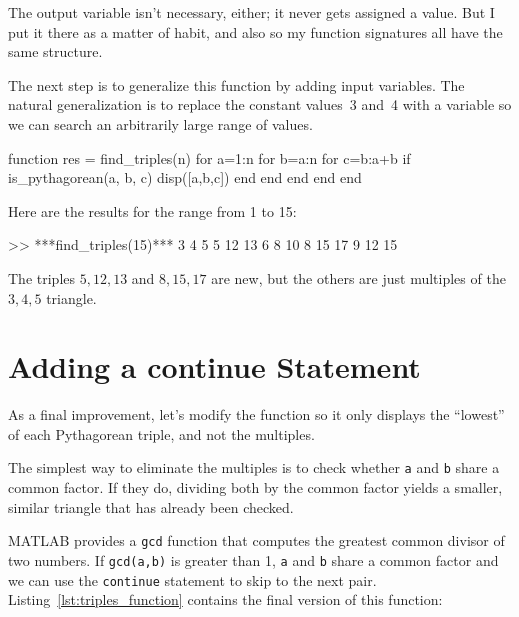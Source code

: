 The output variable isn't necessary, either; it
never gets assigned a value.  But I put it there as a matter of
habit, and also so my function signatures all have the same structure.


The next step is to generalize this function by adding input
variables.  The natural generalization is to replace the constant
values~3 and~4 with a variable so we can search an arbitrarily large
range of values.

\begin{code}
function res = find_triples(n)
    for a=1:n
        for b=a:n
            for c=b:a+b
                if is_pythagorean(a, b, c)
                    disp([a,b,c])
                end
            end
        end
    end
end
\end{code}

Here are the results for the range from 1 to 15:

\begin{code}
>> ***find_triples(15)***
     3     4     5
     5    12    13
     6     8    10
     8    15    17
     9    12    15
\end{code}

The triples $5,12,13$ and $8,15,17$ are new, but the others are just multiples of the $3,4,5$ triangle.

\section{Adding a continue Statement}


As a final improvement, let's modify the function so it only
displays the ``lowest'' of each Pythagorean triple, and not the
multiples.

The simplest way to eliminate the multiples is to check whether
\lstinline{a} and \lstinline{b} share a common factor.  If they do, dividing both
by the common factor yields a smaller, similar triangle that has
already been checked.


MATLAB provides a \lstinline{gcd} function that computes the greatest common
divisor of two numbers.  If \lstinline{gcd(a,b)} is greater than 1,
\lstinline{a} and \lstinline{b} share a common factor and we can use the \lstinline{continue}
statement to skip to the next pair. Listing~\ref{lst:triples_function} contains the final version of this function:

